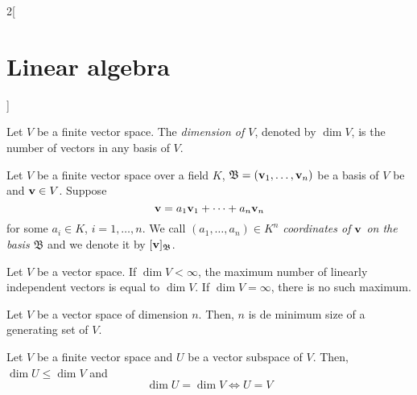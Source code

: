\documentclass[../../../main.tex]{subfiles}
\begin{document}
\begin{multicols}{2}[\section{Linear algebra}]
  \begin{definition}
    Let $V$ be a finite vector space. The \textit{dimension of $V$}, denoted by $\dim V$, is the number of vectors in any basis of $V$.
  \end{definition}
  \begin{definition}
    Let $V$ be a finite vector space over a field $K$, $\mathfrak{B}=(\vb{v}_1,\ldots,\vb{v}_n)$ be a basis of $V$ be and $\vb{v}\in V$. Suppose $$\vb{v}=a_1\vb{v}_1+\cdots+a_n\vb{v}_n$$ for some $a_i\in K$, $i=1,\ldots,n$. We call $(a_1,\ldots,a_n)\in K^n$ \textit{coordinates of $\vb{v}$ on the basis $\mathfrak{B}$} and we denote it by $[\vb{v}]_{\mathfrak{B}}$.
  \end{definition}
  \begin{prop}
    Let $V$ be a vector space. If $\dim V<\infty$, the maximum number of linearly independent vectors is equal to $\dim V$. If $\dim V=\infty$, there is no such maximum.
  \end{prop}
  \begin{prop}
    Let $V$ be a vector space of dimension $n$. Then, $n$ is de minimum size of a generating set of $V$.
  \end{prop}
  \begin{prop}
    Let $V$ be a finite vector space and $U$ be a vector subspace of $V$. Then, $\dim U\leq\dim V$ and $$\dim U=\dim V\iff U=V$$
  \end{prop}

\end{multicols}
\end{document}
